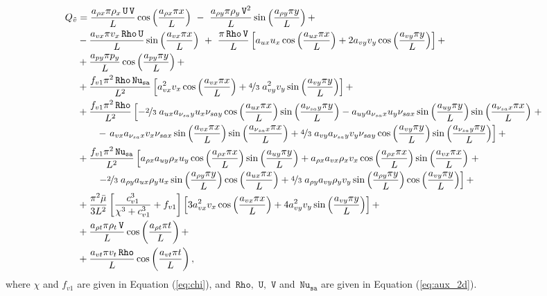 \documentclass[10pt]{article}
\newcommand{\Rho}{\,\mathtt{Rho}}
\newcommand{\U}{\,\mathtt{U}}
\newcommand{\V}{\,\mathtt{V}}
\newcommand{\Nu}{\,\mathtt{Nu_{sa}}}
\newcommand{\tv}{\tilde{v}}
\newcommand{\bmu}{\bar{\mu}}
\begin{document}
\begin{equation}
 \begin{split}
Q_{\tv} &= \dfrac{a_{\rho x} \pi \rho_x \U \V  }{L}\cos\left(\dfrac{a_{\rho x} \pi x}{L}\right) \,\,-\,\,\dfrac{a_{\rho y} \pi \rho_y \V^2 }{L} \sin\left(\dfrac{a_{\rho y} \pi y}{L}\right)+ \\
&-\dfrac{a_{vx} \pi v_x \Rho \U  }{L}\sin\left(\dfrac{a_{vx} \pi x}{L}\right)\,\,+\,\,\dfrac{ \pi \Rho \V}{L}\left[a_{ux} u_x  \cos\left(\dfrac{a_{ux} \pi x}{L}\right)+2 a_{vy} v_y  \cos\left(\dfrac{a_{vy} \pi y}{L}\right)\right]+ \\
&+\dfrac{a_{py} \pi p_y  }{L}\cos\left(\dfrac{a_{py} \pi y}{L}\right)+ \\
&+\dfrac{f_{v1} \pi^2 \Rho \Nu}{L^2}\left[a_{vx}^2 v_x  \cos\left(\dfrac{a_{vx} \pi x}{L}\right)+\nicefrac{4}{3} \; a_{vy}^2 v_y  \sin\left(\dfrac{a_{vy} \pi y}{L}\right)\right] + \\
&+\dfrac{f_{v1} \pi^2 \Rho}{L^2}\left[-\nicefrac{2}{3} \; a_{ux} a_{\nu_{sa} y} u_x \nu_{sa y}  \cos\left(\dfrac{a_{ux} \pi x}{L}\right)  \sin\left(\dfrac{a_{\nu_{sa} y} \pi y}{L}\right)- a_{uy} a_{\nu_{sa} x} u_y \nu_{sa x} \sin\left(\dfrac{a_{uy} \pi y}{L}\right)  \sin\left(\dfrac{a_{\nu_{sa} x} \pi x}{L}\right)\right.+\\
    &\qquad -\left. a_{vx} a_{\nu_{sa} x} v_x \nu_{sa x} \sin\left(\dfrac{a_{vx} \pi x}{L}\right)  \sin\left(\dfrac{a_{\nu_{sa} x} \pi x}{L}\right)+\nicefrac{4}{3} \;  a_{vy} a_{\nu_{sa} y} v_y \nu_{sa y} \cos\left(\dfrac{a_{vy} \pi y}{L}\right)  \sin\left(\dfrac{a_{\nu_{sa} y} \pi y}{L}\right)\right] + \\
&+\dfrac{f_{v1} \pi^2 \Nu }{L^2}\left[a_{\rho x} a_{uy} \rho_x u_y  \cos\left(\dfrac{a_{\rho x} \pi x}{L}\right)  \sin\left(\dfrac{a_{uy} \pi y}{L}\right)+a_{\rho x} a_{vx} \rho_x v_x  \cos\left(\dfrac{a_{\rho x} \pi x}{L}\right)  \sin\left(\dfrac{a_{vx} \pi x}{L}\right)\right.+\\
    &\qquad\left. -\nicefrac{2}{3} \; a_{\rho y} a_{ux} \rho_y u_x  \sin\left(\dfrac{a_{\rho y} \pi y}{L}\right)  \cos\left(\dfrac{a_{ux} \pi x}{L}\right)+\nicefrac{4}{3} \; a_{\rho y} a_{vy} \rho_y v_y  \sin\left(\dfrac{a_{\rho y} \pi y}{L}\right)  \cos\left(\dfrac{a_{vy} \pi y}{L}\right)\right] + \\
&+ \dfrac{\pi^2 \bmu}{3L^2}\left[\dfrac{c_{v1}^3 }{ \chi^3+c_{v1}^3} +f_{v1}\right]\left[3 a_{vx}^2 v_x  \cos\left(\dfrac{a_{vx} \pi x}{L}\right)+4 a_{vy}^2 v_y  \sin\left(\dfrac{a_{vy} \pi y}{L}\right)\right] +\\
&+\dfrac{a_{\rho t} \pi \rho_t \V}{L}  \cos\left(\dfrac{a_{\rho t} \pi t}{L}\right)+ \\
&+\dfrac{a_{vt} \pi v_t \Rho }{L} \cos\left(\dfrac{a_{vt} \pi t}{L}\right),
 \end{split}
\end{equation}
where $\chi$ and $f_{v1}$ are given in  Equation (\ref{eq:chi}), and  $\Rho,\,\U,\,\V$ and $\Nu$ are given in Equation (\ref{eq:aux_2d}).
\end{document}
